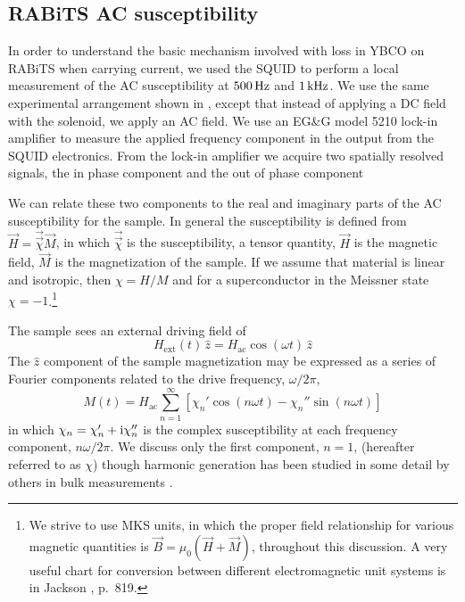 %
%
\subsection{RABiTS AC susceptibility}
\label{sec:rabits_ac_sus}

In order to understand the basic mechanism involved with loss in
YBCO on RABiTS when carrying current, we used the SQUID to perform a local
measurement of the AC susceptibility at $500\,\mathrm{Hz}$ and 
$1\,\mathrm{kHz}$. 
We use the same experimental arrangement shown in 
, except that instead of 
applying a DC field with the solenoid, we apply an AC field. 
We use an EG\&G model 5210
lock-in amplifier\cite{EGG} to measure the applied frequency
component in the output from the SQUID electronics. 
From the 
lock-in amplifier we acquire two spatially resolved signals, 
the in phase component and the out of phase component

We can relate these two components to the real and imaginary parts
of the AC susceptibility for the sample. In general the susceptibility is
defined from 
$\vec H = \vec {\vec \chi} \vec M$, in which $\vec{ \vec \chi}$ is the 
susceptibility, a tensor quantity,
$\vec H$ is the magnetic field, $\vec M$ is the magnetization
of the sample. If we assume that material is linear and isotropic, then 
$\chi = H/M$ and for a superconductor in the Meissner state
$\chi=-1$.\footnote{We strive to use MKS units, in which the proper
field relationship for various magnetic quantities is 
$\vec B=\mu_0(\vec H+\vec M)$,
throughout this 
discussion. A very useful chart for conversion between different
electromagnetic unit systems is in Jackson \cite{jackson}, p.~819.}

The sample sees an external driving field of
%
\begin{equation}
H_{\mathrm{ext}}(t) \, \hat z = H_{\mathrm{ac}}\cos(\omega t)\, \hat z
\end{equation}
%
The $\hat z$ component of the sample magnetization 
may be expressed as a series of
Fourier components related to the drive frequency, $\omega/2\pi$,
%
\begin{equation}
M(t) = H_{\mathrm{ac}} \sum_{n=1}^{\infty} 
\left[ \chi_n' \cos (n \omega t) - \chi_n'' \sin (n \omega t) \right]
\end{equation}
in which $\chi_n=\chi_n' + \mathrm{i} \chi_n''$ is the complex susceptibility
at each frequency component, $n\omega/2\pi$. 
We discuss only the first component, $n=1$,
(hereafter referred to as $\chi$) though 
harmonic generation has been studied in some detail by others 
in bulk measurements
\cite{ishida_prb_41_8937_1990,yamamoto_prb_46_1122_1992}. 

